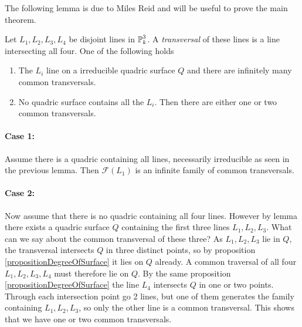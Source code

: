 The following lemma is due to Miles Reid and will be useful to prove the main theorem.
\begin{lemma}
Let $L_1,L_2,L_3,L_4$ be disjoint lines in $\operatorname{\mathbb P}^3_k$.
A \emph{transversal} of these lines is a line intersecting all four.
One of the following holds
\begin{enumerate}
\item The $L_i$ line on a irreducible quadric surface $Q$ and there are infinitely many common transversals.
\item No quadric surface contains all the $L_i$. Then there are either one or two common transversals.
\end{enumerate}
\paragraph{Case 1:} Assume there is a quadric containing all lines, necessarily irreducible as seen in the previous lemma.
Then $\mathcal F(L_1)$ is an infinite family of common transversals.
\paragraph{Case 2:} Now assume that there is no quadric containing all four lines.
However by lemma \label{lemmaThreeLines} there exists a quadric surface $Q$ containing the first three lines $L_1,L_2,L_3$.
What can we say about the common transversal of these three?
As $L_1,L_2,L_3$ lie in $Q$, the transversal intersects $Q$ in three distinct points, so by proposition \ref{propositionDegreeOfSurface} it lies on $Q$ already.
A common traversal of all four $L_1,L_2,L_3,L_4$ must therefore lie on $Q$.
By the same proposition \ref{propositionDegreeOfSurface} the line $L_4$ intersects $Q$ in one or two points.
Through each intersection point go 2 lines, but one of them generates the family containing $L_1,L_2,L_3$, so only the other line is a common transversal.
This shows that we have one or two common transversals.
\end{lemma}
